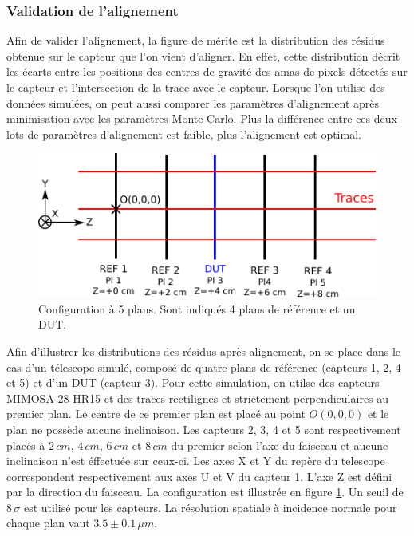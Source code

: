    \subsubsection{Validation de l'alignement}
   
   Afin de valider l'alignement, la figure de m\'erite est la distribution des r\'esidus obtenue sur le capteur que l'on vient d'aligner. En effet, cette distribution d\'ecrit les \'ecarts entre les positions des centres de gravit\'e des amas de pixels d\'etect\'es sur le capteur et l'intersection de la trace avec le capteur. Lorsque l'on utilise des donn\'ees simul\'ees, on peut aussi comparer les param\`etres d'alignement apr\`es minimisation avec les param\`etres Monte Carlo. Plus la diff\'erence entre ces deux lots de param\`etres d'alignement est faible, plus l'alignement est optimal. 
  
  \begin{figure}[!htb]
    \begin{center}
      \includegraphics[scale=1.50]{./figures/5Plans_4REFs_1DUT_tracesDroites.pdf}
      \caption{Configuration \`a 5 plans. Sont indiqu\'es 4 plans de r\'ef\'erence et un DUT.}
      \label{fig:Tel5Pl}
    \end{center}
  \end{figure}
  
   \medskip
  
   Afin d'illustrer les distributions des r\'esidus apr\`es alignement, on se place dans le cas d'un t\'elescope simul\'e, compos\'e de quatre plans de r\'ef\'erence (capteurs 1, 2, 4 et 5) et d'un DUT (capteur 3). Pour cette simulation, on utilse des capteurs MIMOSA-28 HR15 et des traces rectilignes et strictement perpendiculaires au premier plan. Le centre de ce premier plan est plac\'e au point $O(0,0,0)$ et le plan ne poss\`ede aucune inclinaison. Les capteurs 2, 3, 4 et 5 sont respectivement plac\'es \`a $2 \, cm$, $4 \, cm$, $6 \, cm$ et $8 \, cm$ du premier selon l'axe du faisceau et aucune inclinaison n'est \'effectu\'ee sur ceux-ci. Les axes X et Y du rep\`ere du telescope correspondent respectivement aux axes U et V du capteur 1. L'axe Z est d\'efini par la direction du faisceau. La configuration est illustr\'ee en figure \ref{fig:Tel5Pl}. Un seuil de 8$ \, \sigma$ est utilis\'e pour les capteurs. La r\'esolution spatiale \`a incidence normale pour chaque plan vaut $3.5 \pm 0.1 \,\mu m$.
   
